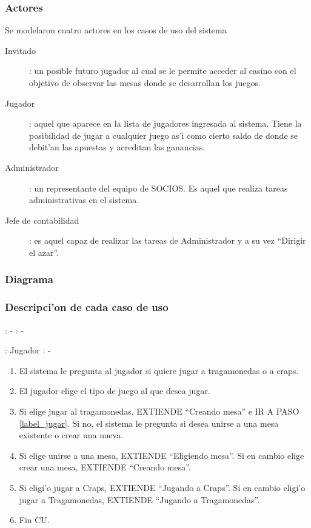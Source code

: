 \subsubsection{Actores}
Se modelaron cuatro actores en los casos de uso del sistema

\begin{description}
\item[Invitado]: un posible futuro jugador al cual se le permite acceder al casino con el objetivo de observar las mesas donde se desarrollan los juegos.
\item[Jugador]: aquel que aparece en la lista de jugadores ingresada al sistema. Tiene la posibilidad de jugar a cualquier juego as'i como cierto saldo de donde se debit'an las apuestas y acreditan las ganancias.
\item[Administrador]: un representante del equipo de SOCIOS. Es aquel que realiza tareas administrativas en el sistema.
\item[Jefe de contabilidad]: es aquel capaz de realizar las tareas de Administrador y a su vez ``Dirigir el azar''.
\end{description}



\subsubsection{Diagrama}


\subsubsection{Descripci'on de cada caso de uso}

: - \newline
\indent{}: -

: Jugador \newline
\indent{}: -

\begin{enumerate}
\item El sistema le pregunta al jugador si quiere jugar a tragamonedas o a craps.
\item El jugador elige el tipo de juego al que desea jugar.
\item Si elige jugar al tragamonedas, EXTIENDE ``Creando mesa'' e IR A PASO \ref{label_jugar}. Si no, el sistema le pregunta si desea unirse a una mesa existente o crear una nueva.
\item Si elige unirse a una mesa, EXTIENDE ``Eligiendo mesa''. Si en cambio elige crear una mesa, EXTIENDE ``Creando mesa''.
\item Si eligi'o jugar a Craps, EXTIENDE ``Jugando a Craps''. Si en cambio eligi'o jugar a Tragamonedas, EXTIENDE ``Jugando a Tragamonedas''.\label{label_jugar}
\item Fin CU.
\end{enumerate}



